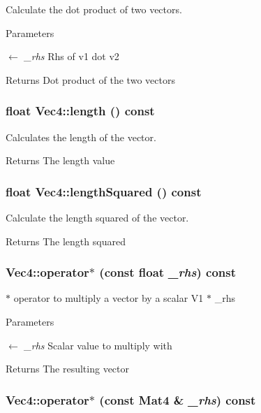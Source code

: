 Calculate the dot product of two vectors. 
\begin{DoxyParams}{Parameters}
\item[\mbox{$\leftarrow$} {\em \_\-rhs}]Rhs of v1 dot v2 \end{DoxyParams}
\begin{DoxyReturn}{Returns}
Dot product of the two vectors 
\end{DoxyReturn}
\hypertarget{classVec4_a08573e03357a6d14294da98c46cbab58}{
\subsubsection[{length}]{\setlength{\rightskip}{0pt plus 5cm}float Vec4::length () const}}
\label{classVec4_a08573e03357a6d14294da98c46cbab58}


Calculates the length of the vector. \begin{DoxyReturn}{Returns}
The length value 
\end{DoxyReturn}
\hypertarget{classVec4_ae2413a4eb232a55f15bafa13e49e75b7}{
\subsubsection[{lengthSquared}]{\setlength{\rightskip}{0pt plus 5cm}float Vec4::lengthSquared () const}}
\label{classVec4_ae2413a4eb232a55f15bafa13e49e75b7}


Calculate the length squared of the vector. \begin{DoxyReturn}{Returns}
The length squared 
\end{DoxyReturn}
\hypertarget{classVec4_a7404d7984c8612d9e9cac17c8609b808}{
\subsubsection[{operator$\ast$}]{ Vec4::operator$\ast$ (const float {\em \_\-rhs}) const}}
\label{classVec4_a7404d7984c8612d9e9cac17c8609b808}


$\ast$ operator to multiply a vector by a scalar V1 $\ast$ \_\-rhs 
\begin{DoxyParams}{Parameters}
\item[\mbox{$\leftarrow$} {\em \_\-rhs}]Scalar value to multiply with \end{DoxyParams}
\begin{DoxyReturn}{Returns}
The resulting vector 
\end{DoxyReturn}
\hypertarget{classVec4_ab73619ea670cbd2eb25e5a3ef49dfd9a}{
\subsubsection[{operator$\ast$}]{ Vec4::operator$\ast$ (const {\bf Mat4} \& {\em \_\-rhs}) const}}
\label{classVec4_ab73619ea670cbd2eb25e5a3ef49dfd9a}


